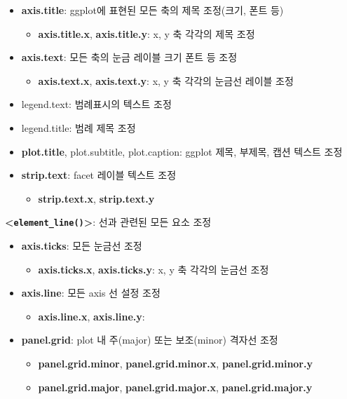 \documentclass[
  11pt,
]{krantz}
\providecommand{\tightlist}{%
  \setlength{\itemsep}{0pt}\setlength{\parskip}{0pt}}
\begin{document}
\begin{itemize}
\tightlist
\item
  \textbf{axis.title}: ggplot에 표현된 모든 축의 제목 조정(크기, 폰트 등)

  \begin{itemize}
  \tightlist
  \item
    \textbf{axis.title.x}, \textbf{axis.title.y}: x, y 축 각각의 제목 조정
  \end{itemize}
\item
  \textbf{axis.text}: 모든 축의 눈금 레이블 크기 폰트 등 조정

  \begin{itemize}
  \tightlist
  \item
    \textbf{axis.text.x}, \textbf{axis.text.y}: x, y 축 각각의 눈금선 레이블 조정
  \end{itemize}
\item
  legend.text: 범례표시의 텍스트 조정
\item
  legend.title: 범례 제목 조정
\item
  \textbf{plot.title}, plot.subtitle, plot.caption: ggplot 제목, 부제목, 캡션 텍스트 조정
\item
  \textbf{strip.text}: facet 레이블 텍스트 조정

  \begin{itemize}
  \tightlist
  \item
    \textbf{strip.text.x}, \textbf{strip.text.y}
  \end{itemize}
\end{itemize}

\textbf{\textless{}\texttt{element\_line()}\textgreater{}}: 선과 관련된 모든 요소 조정

\begin{itemize}
\tightlist
\item
  \textbf{axis.ticks}: 모든 눈금선 조정

  \begin{itemize}
  \tightlist
  \item
    \textbf{axis.ticks.x}, \textbf{axis.ticks.y}: x, y 축 각각의 눈금선 조정
  \end{itemize}
\item
  \textbf{axis.line}: 모든 axis 선 설정 조정

  \begin{itemize}
  \tightlist
  \item
    \textbf{axis.line.x}, \textbf{axis.line.y}:
  \end{itemize}
\item
  \textbf{panel.grid}: plot 내 주(major) 또는 보조(minor) 격자선 조정

  \begin{itemize}
  \tightlist
  \item
    \textbf{panel.grid.minor}, \textbf{panel.grid.minor.x}, \textbf{panel.grid.minor.y}
  \item
    \textbf{panel.grid.major}, \textbf{panel.grid.major.x}, \textbf{panel.grid.major.y}
  \end{itemize}
\end{itemize}
\end{document}
